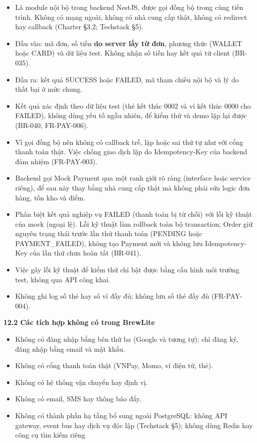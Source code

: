 \documentclass[11pt,a4paper,oneside]{report}
\begin{document}
\begin{itemize}
\item
  Là module nội bộ trong backend NestJS, được gọi đồng bộ trong cùng tiến trình. Không có mạng ngoài, không có nhà cung cấp thật, không có redirect hay callback (Charter §3.2; Techstack §5).
\item
  Đầu vào: mã đơn, số tiền \textbf{do server lấy từ đơn}, phương thức (WALLET hoặc CARD) và dữ liệu test. Không nhận số tiền hay kết quả từ client (BR-035).
\item
  Đầu ra: kết quả SUCCESS hoặc FAILED, mã tham chiếu nội bộ và lý do thất bại ở mức chung.
\item
  Kết quả xác định theo dữ liệu test (thẻ kết thúc 0002 và ví kết thúc 0000 cho FAILED), không dùng yếu tố ngẫu nhiên, để kiểm thử và demo lặp lại được (BR-040, FR-PAY-006).
\item
  Vì gọi đồng bộ nên không có callback trễ, lặp hoặc sai thứ tự như với cổng thanh toán thật. Việc chống giao dịch lặp do Idempotency-Key của backend đảm nhiệm (FR-PAY-003).
\item
  Backend gọi Mock Payment qua một ranh giới rõ ràng (interface hoặc service riêng), để sau này thay bằng nhà cung cấp thật mà không phải sửa logic đơn hàng, tồn kho và điểm.
\item
  Phân biệt kết quả nghiệp vụ FAILED (thanh toán bị từ chối) với lỗi kỹ thuật của mock (ngoại lệ). Lỗi kỹ thuật làm rollback toàn bộ transaction; Order giữ nguyên trạng thái trước lần thử thanh toán (PENDING hoặc PAYMENT\_FAILED), không tạo Payment mới và không lưu Idempotency-Key của lần thử chưa hoàn tất (BR-041).
\item
  Việc gây lỗi kỹ thuật để kiểm thử chỉ bật được bằng cấu hình môi trường test, không qua API công khai.
\item
  Không ghi log số thẻ hay số ví đầy đủ; không lưu số thẻ đầy đủ (FR-PAY-004).
\end{itemize}

\textbf{12.2 Các tích hợp không có trong BrewLite}

\begin{itemize}
\item
  Không có đăng nhập bằng bên thứ ba (Google và tương tự); chỉ đăng ký, đăng nhập bằng email và mật khẩu.
\item
  Không có cổng thanh toán thật (VNPay, Momo, ví điện tử, thẻ).
\item
  Không có hệ thống vận chuyển hay định vị.
\item
  Không có email, SMS hay thông báo đẩy.
\item
  Không có thành phần hạ tầng bổ sung ngoài PostgreSQL: không API gateway, event bus hay dịch vụ độc lập (Techstack §5); không dùng Redis hay công cụ tìm kiếm riêng
\end{itemize}
\end{document}
